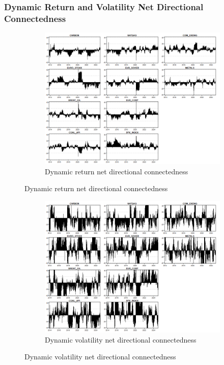 \documentclass[preprint, 3p,
authoryear]{elsarticle} %
\begin{document}
\begin{landscape}
\subsubsection{Dynamic Return and Volatility Net Directional Connectedness}

\begin{figure}[H]
  \caption{Dynamic Net Directional Connectedness (Jan 2013 – Jan 2025)}
    \centering
      \begin{subfigure}[a]{\textwidth}
        \caption{Dynamic return net directional connectedness}
        \includegraphics[width = 1.25\linewidth]{26aApdxD-12-200-RetNDC}
      \end{subfigure}
\end{figure}
\begin{figure}[H]
  \ContinuedFloat
  \centering
      \begin{subfigure}[b]{\textwidth}
        \caption{Dynamic volatility net directional connectedness}
        \includegraphics[width = 1.25\linewidth]{26bApdxD-12-200-VolNDC}
      \end{subfigure}
\end{figure}




\end{landscape}
\end{document}
